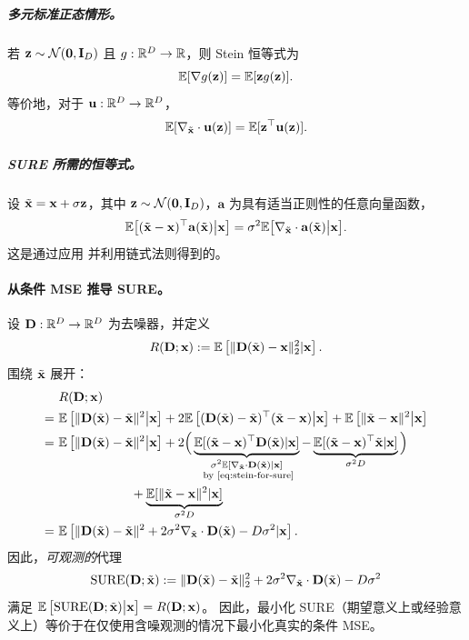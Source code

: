 \subparagraph{多元标准正态情形。}
若 ${\mathbf{z}} \sim \mathcal{N}(\mathbf{0},{\mathbf{I}}_D)$ 且 $g:\mathbb{R}^D \to \mathbb{R}$，则 Stein 恒等式为
\[
\mathbb{E}[\nabla g({\mathbf{z}})]  =  \mathbb{E}[{\mathbf{z}} g({\mathbf{z}})].
\]
等价地，对于 $\mathbf{u}:\mathbb{R}^D \to \mathbb{R}^D$，
\begin{align}\label{eq:stein-multi}
    \mathbb{E}[ \nabla_{\tilde{{\mathbf{x}}}} \cdot\mathbf{u}({\mathbf{z}})]  =  \mathbb{E}[{\mathbf{z}}^\top \mathbf{u}({\mathbf{z}})] .
\end{align}


\subparagraph{SURE 所需的恒等式。}
设 $\tilde{{\mathbf{x}}}={\mathbf{x}}+\sigma{\mathbf{z}}$，其中 ${\mathbf{z}} \sim \mathcal{N}(\mathbf{0},{\mathbf{I}}_D)$，$\mathbf{a}$ 为具有适当正则性的任意向量函数，
\begin{align}\label{eq:stein-for-sure}
    \mathbb{E}\big[(\tilde{{\mathbf{x}}}-{\mathbf{x}})^\top \mathbf{a}(\tilde{{\mathbf{x}}})  \big|  {\mathbf{x}}\big]
 =  \sigma^2 \mathbb{E}\big[ \nabla_{\tilde{{\mathbf{x}}}} \cdot\mathbf{a}(\tilde{{\mathbf{x}}})  \big|  {\mathbf{x}}\big]. 
\end{align}
这是通过应用  并利用链式法则得到的。

\paragraph{从条件 MSE 推导 SURE。}
设 ${\mathbf{D}}:\mathbb{R}^D \to \mathbb{R}^D$ 为去噪器，并定义
\[
R({\mathbf{D}};{\mathbf{x}}):=\mathbb{E} \left[\|{\mathbf{D}}(\tilde{{\mathbf{x}}})-{\mathbf{x}}\|_2^2| {\mathbf{x}}\right].
\]
围绕 $\tilde{{\mathbf{x}}}$ 展开：
\[
\begin{aligned}
&~R(\rmD;\rvx) \\
=&~\E \left[\|\rmD(\tilde{\rvx})-\tilde{\rvx}\|^2  \big|  \rvx\right]
+2 \E \left[(\rmD(\tilde{\rvx})-\tilde{\rvx})^\top(\tilde{\rvx}-\rvx)  \big|  \rvx\right]
+\E \left[\|\tilde{\rvx}-\rvx\|^2  \big|  \rvx\right] \\
=&~\E \left[\|\rmD(\tilde{\rvx})-\tilde{\rvx}\|^2  \big|  \rvx\right]
+2\Big(\underbrace{\E[(\tilde{\rvx}-\rvx)^\top \rmD(\tilde{\rvx})|\rvx]}_{\substack{\sigma^2 \E[ \nabla_{\tilde{\rvx}} \cdot\rmD(\tilde{\rvx})|\rvx] \\  \text{ by \Cref{eq:stein-for-sure}}
}}
-\underbrace{\E[(\tilde{\rvx}-\rvx)^\top \tilde{\rvx}|\rvx]}_{ \sigma^2 D}\Big)
\\&\qquad\qquad\qquad+\underbrace{\E[\|\tilde{\rvx}-\rvx\|^2|\rvx]}_{ \sigma^2 D} \\
=&~\E \left[\|\rmD(\tilde{\rvx})-\tilde{\rvx}\|^2
+2\sigma^2  \nabla_{\tilde{\rvx}} \cdot\rmD(\tilde{\rvx})
-D\sigma^2 | \rvx\right].
\end{aligned}
\]
因此，\emph{可观测的}代理
\[ 
\mathrm{SURE}({\mathbf{D}};\tilde{{\mathbf{x}}})
:= \|{\mathbf{D}}(\tilde{{\mathbf{x}}})-\tilde{{\mathbf{x}}}\|_2^2
+2\sigma^2  \nabla_{\tilde{{\mathbf{x}}}} \cdot{\mathbf{D}}(\tilde{{\mathbf{x}}})
-D\sigma^2 
\]
满足 $\mathbb{E} \left[\mathrm{SURE}({\mathbf{D}};\tilde{{\mathbf{x}}}) \big| {\mathbf{x}}\right]=R({\mathbf{D}};{\mathbf{x}})$。
因此，最小化 SURE（期望意义上或经验意义上）等价于在仅使用含噪观测的情况下最小化真实的条件 MSE。



